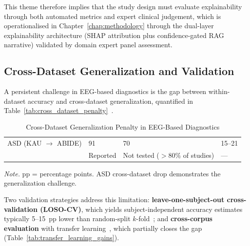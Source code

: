 \noindent This theme therefore implies that the study design must evaluate explainability through both automated metrics and expert clinical judgement, which is operationalised in Chapter~\ref{chap:methodology} through the dual-layer explainability architecture (SHAP attribution plus confidence-gated RAG narrative) validated by domain expert panel assessment.

\subsection{Cross-Dataset Generalization and Validation}

A persistent challenge in EEG-based diagnostics is the gap between within-dataset accuracy and cross-dataset generalization, quantified in Table~\ref{tab:cross_dataset_penalty}~\cite{dimartino2014abide, geraedts2018eeg}.

\begin{table}[H]
\tablestripes\tablefontsize
\tablefontsize
\caption[Cross-Dataset Generalization Penalty]{Cross-Dataset Generalization Penalty in EEG-Based Diagnostics}
\begin{tabularx}{\textwidth}{@{} >{\raggedright\arraybackslash}p{2.5cm} L L L @{}}
\toprule
{} &  &  &  \\
\midrule
ASD (KAU $\to$ ABIDE) & 91 & 70 & 15--21 \\
& Reported & Not tested ($>$80\% of studies) & --- \\
\bottomrule
\end{tabularx}
\vspace{0.5em}\noindent\textit{Note.} pp = percentage points. ASD cross-dataset drop demonstrates the generalization challenge.
\end{table}

Two validation strategies address this limitation: \textbf{leave-one-subject-out cross-validation (LOSO-CV)}, which yields subject-independent accuracy estimates typically 5--15~pp lower than random-split $k$-fold~\cite{schirrmeister2017deep, lawhern2018eegnet}; and \textbf{cross-corpus evaluation} with transfer learning~\cite{pan2010transfer, li2022domain}, which partially closes the gap (Table~\ref{tab:transfer_learning_gains}).


